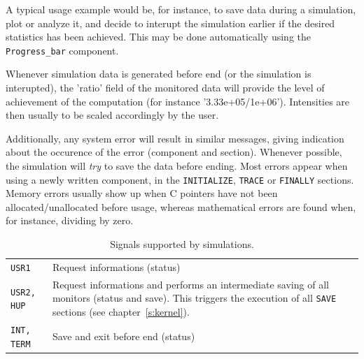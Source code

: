 A typical usage example would be, for instance, to save data during a
simulation, plot or analyze it, and decide to interupt the simulation
earlier if the desired statistics has been achieved. This may be done automatically using the \verb+Progress_bar+ component.

Whenever simulation data is generated before end (or the simulation is
interupted), the 'ratio' field of the monitored data will provide the
level of achievement of the computation (for instance
'3.33e+05/1e+06'). Intensities are then usually to be scaled
accordingly by the user.

Additionally, any system error will result in similar messages, giving
indication about the occurence of the error (component and
section). Whenever possible, the simulation will {\em try} to save the
data before ending. Most errors appear when using a newly written component, in the \texttt{INITIALIZE}, \texttt{TRACE} or \texttt{FINALLY} sections. Memory errors usually show up when C pointers have not been allocated/unallocated before usage, whereas mathematical errors are found when, for instance, dividing by zero.

\begin{table}
  \begin{center}
    {\let\my=\\
    \begin{tabular}{|p{}|p{}|}
      \hline
      \texttt{USR1} & Request informations (status)  \\
      \texttt{USR2, HUP} & Request informations and performs an intermediate saving of all monitors (status and save). This triggers the execution of all \texttt{SAVE} sections (see chapter~\ref{s:kernel}).  \\
      \texttt{INT, TERM} & Save and exit before end (status)  \\
      \hline
    \end{tabular}
    \caption{Signals supported by \MCS simulations.}
    \label{t:signals}
    }
  \end{center}
\end{table}

